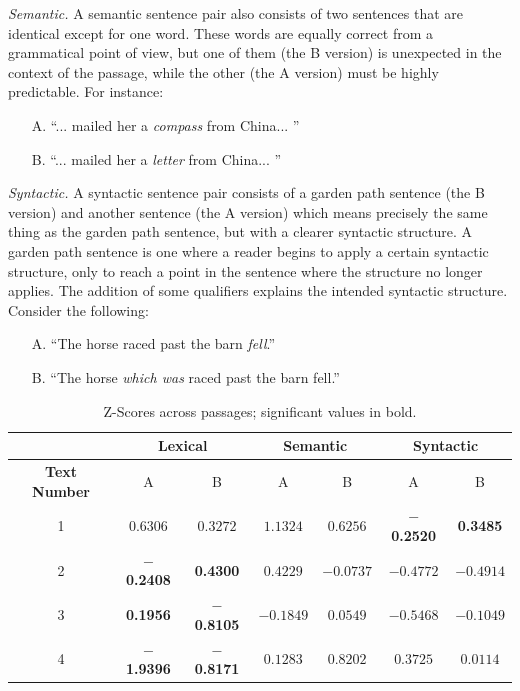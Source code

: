 \documentclass[11pt,letterpaper]{article}
\begin{document}
	\textit{Semantic.} A semantic sentence pair also consists of two sentences that are identical except for one word. These words are equally correct from a grammatical point of view, but one of them (the B version) is unexpected in the context of the passage, while the other (the A version) must be highly predictable. For instance:
	\begin{itemize}[noitemsep, nolistsep]
		\item[A.] ``... mailed her a \textit{compass} from China... ''
		\item[B.] ``... mailed her a \textit{letter} from China... ''
	\end{itemize}
	
	\textit{Syntactic.} A syntactic sentence pair consists of a garden path sentence (the B version) and another sentence (the A version) which means precisely the same thing as the garden path sentence, but with a clearer syntactic structure. A garden path sentence is one where a reader begins to apply a certain syntactic structure, only to reach a point in the sentence where the structure no longer applies. The addition of some qualifiers explains the intended syntactic structure. Consider the following:
	\begin{itemize}[noitemsep, nolistsep]
		\item[A.] ``The horse raced past the barn \textit{fell}.''
		\item[B.] ``The horse \textit{which was} raced past the barn fell.''
	\end{itemize}
	
	
	\begin{table}[t]
		\begin{center}
			\begin{tabular}{*7c}
				\toprule
				 & \multicolumn{2}{c}{\textbf{Lexical}} & \multicolumn{2}{c}{\textbf{Semantic}} & \multicolumn{2}{c}{\textbf{Syntactic}} \\
				\midrule
				\textbf{Text Number} & A & B & A & B & A & B \\
				1 & $ 0.6306 $ & $ 0.3272 $ & $ 1.1324 $ & $ 0.6256 $ & $-$\textbf{0.2520} & \textbf{0.3485} \\
				2 & $-$\textbf{0.2408} & \textbf{0.4300} & $ 0.4229 $ & $ -0.0737 $ & $ -0.4772 $ & $ -0.4914 $ \\
				3 & \textbf{0.1956} & $-$\textbf{0.8105} & $ -0.1849 $ & $ 0.0549 $ & $ -0.5468 $ & $ -0.1049 $ \\
				4 & $-$\textbf{1.9396} & $-$\textbf{0.8171} & $ 0.1283 $ & $ 0.8202 $ & $ 0.3725 $ & $ 0.0114 $ \\
				\bottomrule
			\end{tabular}
		\end{center}
		\caption{Z-Scores across passages; significant values in bold.}
	\end{table}
	
\end{document}
